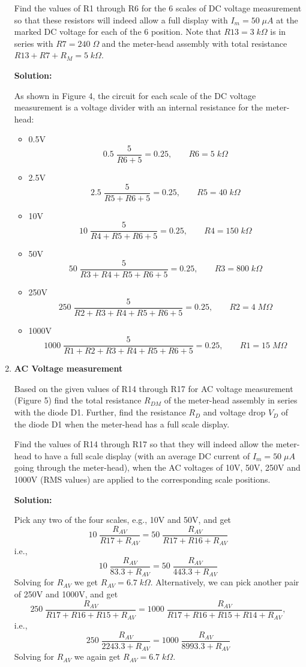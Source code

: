 \begin{enumerate}
  Find the values of R1 through R6 for the 6 scales of DC voltage measurement
  so that these resistors will indeed allow a full display with $I_m=50\;\mu A$ 
  at the marked DC voltage for each of the 6 position. Note that $R13=3\;k\Omega$ 
  is in series with $R7=240\;\Omega$ and the meter-head assembly with total 
  resistance $R13+R7+R_M=5\;k\Omega$. 
  
  
  {\bf Solution:}

  As shown in Figure 4, the circuit for each scale of the DC voltage measurement 
  is a voltage divider with an internal resistance for the meter-head:
  \begin{itemize}
  \item 0.5V
    \[
    0.5\;\frac{5}{R6+5}=0.25,\;\;\;\;\;\;\;R6=5\;k\Omega
    \]
  \item 2.5V
    \[
    2.5\;\frac{5}{R5+R6+5}=0.25,\;\;\;\;\;\;\;R5=40\;k\Omega
    \]
  \item 10V
    \[
    10\;\frac{5}{R4+R5+R6+5}=0.25,\;\;\;\;\;\;\;R4=150\;k\Omega
    \]
  \item 50V
    \[
    50\;\frac{5}{R3+R4+R5+R6+5}=0.25,\;\;\;\;\;\;\;R3=800\;k\Omega
    \]
  \item 250V
    \[
    250\;\frac{5}{R2+R3+R4+R5+R6+5}=0.25,\;\;\;\;\;\;\;R2=4\;M\Omega
    \]
  \item 1000V
    \[
    1000\;\frac{5}{R1+R2+R3+R4+R5+R6+5}=0.25,\;\;\;\;\;\;\;R1=15\;M\Omega
    \]
  \end{itemize}


\item {\bf AC Voltage measurement}

  Based on the given values of R14 through R17 for AC voltage measurement
  (Figure 5) find the total resistance $R_{DM}$ of the meter-head assembly 
  in series with the diode D1. Further, find the resistance $R_D$ and 
  voltage drop $V_D$ of the diode D1 when the meter-head has a full scale 
  display. 

  Find the values of R14 through R17 so that they will indeed allow the 
  meter-head to have a full scale display (with an average DC current of 
  $I_m=50\;\mu A$ going through the meter-head), when the AC voltages of
  10V, 50V, 250V and 1000V (RMS values) are applied to the corresponding 
  scale positions.


  {\bf Solution:}

  Pick any two of the four scales, e.g., 10V and 50V, and get
  \[
  10\;\frac{R_{AV}}{R17+R_{AV}}=50\;\frac{R_{AV}}{R17+R16+R_{AV}}
  \]
  i.e.,
  \[
  10\;\frac{R_{AV}}{83.3+R_{AV}}=50\;\frac{R_{AV}}{443.3+R_{AV}}
  \]
  Solving for $R_{AV}$ we get $R_{AV}=6.7\;k\Omega$. Alternatively, we can 
  pick another pair of 250V and 1000V, and get
  \[
  250\;\frac{R_{AV}}{R17+R16+R15+R_{AV}}=1000\;\frac{R_{AV}}{R17+R16+R15+R14+R_{AV}},
  \]
  i.e.,
  \[
  250\;\frac{R_{AV}}{2243.3+R_{AV}}=1000\;\frac{R_{AV}}{8993.3+R_{AV}}
  \]
  Solving for $R_{AV}$ we again get $R_{AV}=6.7\;k\Omega$. 
  

\end{enumerate}
